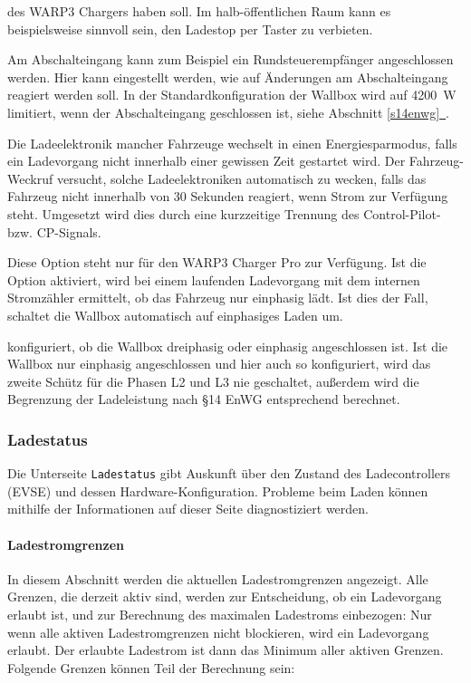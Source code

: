 \documentclass[a4paper,10pt]{article}
\newcommand*{\fullref}[1]{Abschnitt \hyperref[{#1}]{\ref*{#1}~\nameref*{#1}}}
\begin{document}
\begin{multicols*}{2}
\begin{description}[labelindent=0.5cm, leftmargin=0.5cm]
     des WARP3 Chargers haben soll. Im halb-öffentlichen Raum kann es beispielsweise sinnvoll sein,
     den Ladestop per Taster zu verbieten.
     \item[Abschalteingang] Am Abschalteingang kann zum Beispiel ein Rundsteuerempfänger angeschlossen werden.
     Hier kann eingestellt werden, wie auf Änderungen am Abschalteingang
	 reagiert werden soll. In der Standardkonfiguration der Wallbox wird auf \SI{4200}{\watt} limitiert, wenn der Abschalteingang geschlossen ist, siehe \fullref{s14enwg}.
     \item[Fahrzeug-Weckruf] Die Ladeelektronik mancher Fahrzeuge wechselt in
	 einen Energiesparmodus, falls ein Ladevorgang nicht innerhalb einer
	 gewissen Zeit gestartet wird. Der Fahrzeug-Weckruf versucht, solche Ladeelektroniken automatisch zu wecken, falls das Fahrzeug nicht innerhalb von 30 Sekunden reagiert, wenn Strom zur Verfügung steht. Umgesetzt wird dies durch eine kurzzeitige Trennung des Control-Pilot- bzw. CP-Signals.
	 \item[Automatischer Phasenwechsel] Diese Option steht nur für den WARP3
	 Charger Pro zur Verfügung. Ist die Option aktiviert, wird bei einem
	 laufenden Ladevorgang mit dem internen Stromzähler ermittelt, ob das
	 Fahrzeug nur einphasig lädt.
	 Ist dies der Fall, schaltet die Wallbox automatisch auf einphasiges
	 Laden um.
	 \item[Zuleitung] konfiguriert, ob die Wallbox
	 dreiphasig oder einphasig angeschlossen ist. Ist die
	 Wallbox nur einphasig angeschlossen und hier auch so konfiguriert, wird das zweite
	 Schütz für die Phasen L2 und L3 nie geschaltet, außerdem wird die Begrenzung der Ladeleistung nach \S14 EnWG entsprechend berechnet.
    \end{description}

    \subsubsection{Ladestatus}\label{evse}
    Die Unterseite \texttt{Ladestatus} gibt Auskunft über den Zustand
    des Ladecontrollers (EVSE) und dessen Hardware-Konfiguration. Probleme beim Laden
    können mithilfe der Informationen auf dieser Seite diagnostiziert werden.

    \paragraph{Ladestromgrenzen}
    In diesem Abschnitt werden die aktuellen Ladestromgrenzen angezeigt. Alle Grenzen, die
    derzeit aktiv sind, werden zur Entscheidung, ob ein Ladevorgang erlaubt ist, und zur Berechnung des maximalen Ladestroms einbezogen:
    Nur wenn alle aktiven Ladestromgrenzen nicht blockieren, wird ein Ladevorgang erlaubt.
    Der erlaubte Ladestrom ist dann das Minimum aller aktiven Grenzen. Folgende Grenzen können Teil der Berechnung sein:


\end{multicols*}
\end{document}

